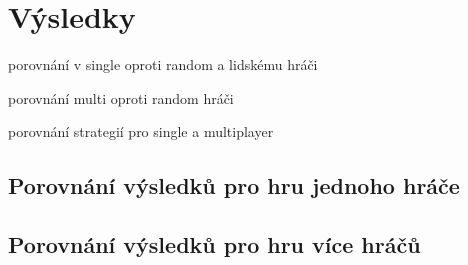 \chapter{Výsledky}
porovnání v single oproti random a lidskému hráči

porovnání multi oproti random hráči

porovnání strategií pro single a multiplayer

\section{Porovnání výsledků pro hru jednoho hráče}
\section{Porovnání výsledků pro hru více hráčů}